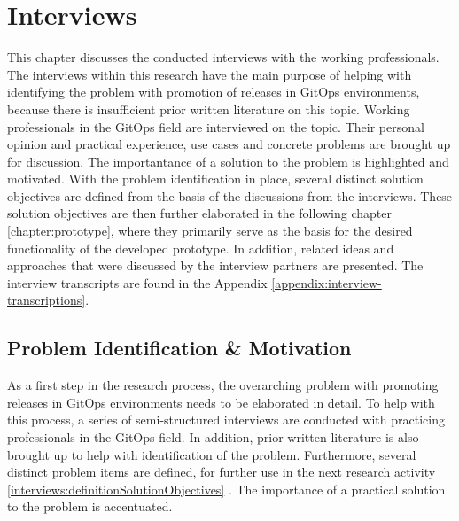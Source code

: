 

\chapter{Interviews}
\label{interviews}

This chapter discusses the conducted interviews with the working professionals.
The interviews within this research have the main purpose of helping with
identifying the problem with promotion of releases in GitOps environments,
because there is insufficient prior written literature on this topic.
Working professionals in the GitOps field are interviewed on the topic.
Their personal opinion and practical experience, use cases and concrete problems
are brought up for discussion. The importantance of a solution to the
problem is highlighted and motivated.
With the problem identification in place, several distinct solution objectives
are defined from the basis of the discussions from the interviews.
These solution objectives are then further elaborated in the following chapter
\ref{chapter:prototype}, where they primarily serve as the basis for the
desired functionality of the developed prototype.
In addition, related ideas and approaches that were discussed by the interview partners
are presented.
The interview transcripts are found in the Appendix \ref{appendix:interview-transcriptions}.

\section{Problem Identification \& Motivation}
\label{interviews:problem-identification}

As a first step in the research process,
the overarching problem with promoting releases in GitOps environments
needs to be elaborated in detail.
To help with this process, a series of semi-structured interviews are conducted with
practicing professionals in the GitOps field. In addition, prior written literature
is also brought up to help with identification of the problem.
Furthermore, several distinct problem items are defined,
for further use in the next research activity
\ref{interviews:definitionSolutionObjectives} .
The importance of a practical solution to the problem is accentuated.

